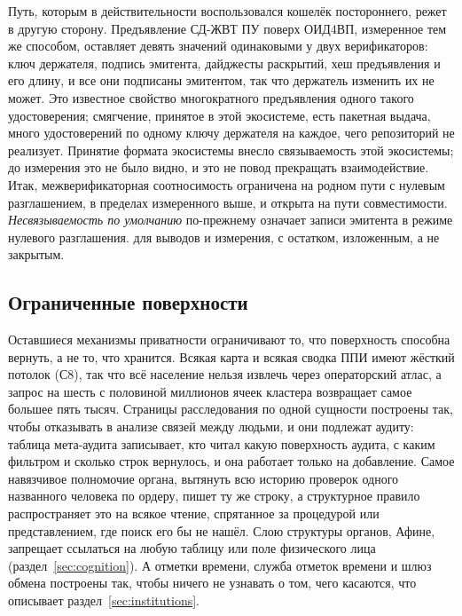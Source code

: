 Путь, которым в действительности воспользовался кошелёк постороннего, режет в другую сторону.
Предъявление СД-ЖВТ ПУ поверх ОИД4ВП, измеренное тем же способом, оставляет девять значений
одинаковыми у двух верификаторов: ключ держателя, подпись эмитента, дайджесты раскрытий, хеш
предъявления и его длину, и все они подписаны эмитентом, так что держатель изменить их не может.
Это известное свойство многократного предъявления одного такого удостоверения; смягчение, принятое
в этой экосистеме, есть пакетная выдача, много удостоверений по одному ключу держателя на каждое,
чего репозиторий не реализует. Принятие формата экосистемы внесло связываемость этой экосистемы;
до измерения это не было видно, и это не повод прекращать взаимодействие. Итак, межверификаторная
соотносимость ограничена на родном пути с нулевым разглашением, в пределах измеренного выше, и
открыта на пути совместимости. \emph{Несвязываемость по умолчанию} по-прежнему означает записи
эмитента в режиме нулевого разглашения. \sImplMark{} для выводов и измерения, с остатком, изложенным,
а не закрытым.

\subsection{Ограниченные поверхности}

Оставшиеся механизмы приватности ограничивают то, что поверхность способна вернуть, а не то, что
хранится. Всякая карта и всякая сводка ППИ имеют жёсткий потолок (С8), так что всё население нельзя
извлечь через операторский атлас, а запрос на шесть с половиной миллионов ячеек кластера
возвращает самое большее пять тысяч. Страницы расследования по одной сущности построены так, чтобы
отказывать в анализе связей между людьми, и они подлежат аудиту: таблица мета-аудита записывает,
кто читал какую поверхность аудита, с каким фильтром и сколько строк вернулось, и она работает
только на добавление. Самое навязчивое полномочие органа, вытянуть всю историю проверок одного
названного человека по ордеру, пишет ту же строку, а структурное правило распространяет это на
всякое чтение, спрятанное за процедурой или представлением, где поиск  его бы не
нашёл. Слою структуры
органов, Афине,  запрещает ссылаться на любую таблицу или поле физического лица
(раздел~\ref{sec:cognition}). А отметки времени, служба отметок времени и шлюз обмена построены
так, чтобы ничего не узнавать о том, чего касаются, что описывает раздел~\ref{sec:institutions}.
\sImpl

